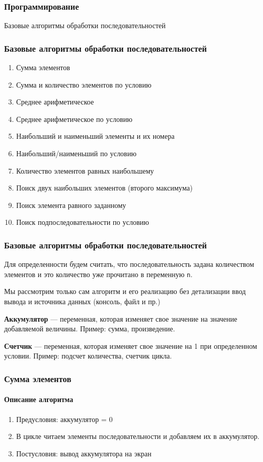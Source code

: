 \begin{frame}
\frametitle{Программирование}

\begin{center}

\Huge
Базовые алгоритмы обработки последовательностей
\end{center}
\end{frame}

\begin{frame}
\frametitle{Базовые алгоритмы обработки последовательностей}

\begin{enumerate}
	\item Сумма элементов
	\item Сумма и количество элементов по условию
	\item Среднее арифметическое
	\item Среднее арифметическое по условию
	\item Наибольший и наименьший элементы и их номера
	\item Наибольший/наименьший по условию
	\item Количество элементов равных наибольшему
	\item Поиск двух наибольших элементов (второго максимума)
	\item Поиск элемента равного заданному
	\item Поиск подпоследовательности по условию
\end{enumerate}


\end{frame}

\begin{frame}
\frametitle{Базовые алгоритмы обработки последовательностей}

Для определенности будем считать, что последовательность задана количеством элементов и это количество уже прочитано в переменную \texttt{n}.

Мы рассмотрим только сам алгоритм и его реализацию без детализации ввод вывода и источника данных (консоль, файл и пр.)

\textbf{Аккумулятор} --- переменная, которая изменяет свое значение на значение добавляемой величины. Пример: сумма, произведение.

\textbf{Счетчик} --- переменная, которая изменяет свое значение на 1 при определенном условии. Пример: подсчет количества, счетчик цикла.


\end{frame}

\begin{frame}[fragile]
\frametitle{Сумма элементов}
\framesubtitle{Описание алгоритма}
\begin{enumerate}
	\item Предусловия: аккумулятор = 0
	\item В цикле читаем элементы последовательности и добавляем их в аккумулятор.
	\item Постусловия: вывод аккумулятора на экран
\end{enumerate}


\end{frame}

